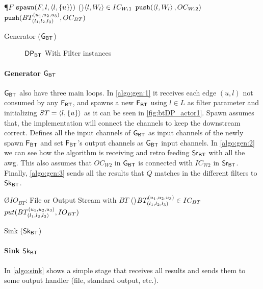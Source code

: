 \begin{algorithm}
\SetAlgoRefName{[A2]}
\P{$F$}
{$\mathtt{spawn}(F, l, \left\langle l, \{u\} \right\rangle)$ \label{algo:gen:1}
}
\ForAll(){$\left\langle l, W_l \right\rangle \in IC_{W_l1}$}
{$\mathtt{push}(\left\langle l, W_l \right\rangle, OC_{W_l2})$ \label{algo:gen:2}
}
{$\mathtt{push}(BT_{(l_1, l_2,l_3)}^{(u_1, u_2, u_3)}, OC_{BT})$ \label{algo:gen:3}
}
\caption{Generator ($\mathsf{G_{BT}}$)}
\label{algo:gen}
\end{algorithm}

\begin{figure}[h]
\centering  
{}
\caption{$\mathsf{DP_{BT}}$ With Filter instances}
\label{fig:btDP_actor1}
\end{figure}

\paragraph{Generator $\mathsf{G_{BT}}$} $\mathsf{G_{BT}}$ also have three main loops. In \autoref{algo:gen:1} it receives each edge $(u,l)$ not consumed by any $\mathsf{F_{BT}}$, and 
spawns a new $\mathsf{F_{BT}}$ using $l \in L$ as filter parameter and initializing $ST = \left\langle l, \{u\} \right\rangle$ as it can be seen in \autoref{fig:btDP_actor1}. 
Spawn assumes that, the implementation will connect the channels to keep the downstream correct. Defines all the input channels of $\mathsf{G_{BT}}$ as input channels of the newly spawn $\mathsf{F_{BT}}$ and set $\mathsf{F_{BT}}$'s output channels as $\mathsf{G_{BT}}$ input channels.
In \autoref{algo:gen:2} we can see how the algorithm is receiving and retro feeding $\mathsf{Sr_{BT}}$ with all the \acrshort{awg}. This also assumes that $OC_{W2}$ in $\mathsf{G_{BT}}$ 
is connected with $IC_{W2}$ in $\mathsf{Sr_{BT}}$.
Finally, \autoref{algo:gen:3} sends all the results that $Q$ matches in the different filters to $\mathsf{Sk_{BT}}$.

\begin{algorithm}
\SetAlgoRefName{[A3]}
\O{$IO_{BT}$: File or Output Stream with $BT$}
\ForAll(){$BT_{(l_1, l_2,l_3)}^{(u_1, u_2, u_3)} \in IC_{BT}$}
{$put(BT_{(l_1, l_2,l_3)}^{(u_1, u_2, u_3)}, IO_{BT})$
}
\caption{Sink ($\mathsf{Sk_{BT}}$)}
\label{algo:sink}
\end{algorithm}

\paragraph{Sink $\mathsf{Sk_{BT}}$} In \autoref{algo:sink} shows a simple stage that receives all results and sends them to some output handler (file, standard output, etc.). 


